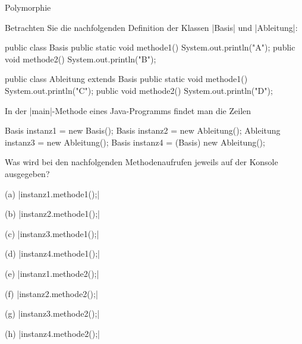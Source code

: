 \begin{exercise}{Polymorphie}
\begin{body}
Betrachten Sie die nachfolgenden Definition der Klassen \code|Basis| und \code|Ableitung|:
\medskip
\begin{displaycode}
public class Basis {
    public static void methode1() {
        System.out.println("A");
    }        
    public void methode2() {
        System.out.println("B");
    }
}
\end{displaycode}
\medskip
\begin{displaycode}
public class Ableitung extends Basis {
    public static void methode1() {
        System.out.println("C");
    }         
    public void methode2() {
        System.out.println("D");
    }
}
\end{displaycode}
\medskip
In der \code|main|-Methode eines Java-Programms findet man die Zeilen
\begin{displaycode}
        Basis instanz1 = new Basis();
        Basis instanz2 = new Ableitung();
        Ableitung instanz3 = new Ableitung();
        Basis instanz4 = (Basis) new Ableitung();
\end{displaycode}
Was wird bei den nachfolgenden Methodenaufrufen jeweils auf der Konsole ausgegeben?
\medskip
\begin{center}
\begin{minipage}{0.45\textwidth}
\begin{parts}
\item[(a)]
\code|instanz1.methode1();|

\item[(b)]
\code|instanz2.methode1();|

\item[(c)]
\code|instanz3.methode1();|

\item[(d)]
\code|instanz4.methode1();|
\end{parts}
\end{minipage}
\begin{minipage}{0.45\textwidth}
\begin{parts}
\item[(e)]
\code|instanz1.methode2();|

\item[(f)]
\code|instanz2.methode2();|

\item[(g)]
\code|instanz3.methode2();|

\item[(h)]
\code|instanz4.methode2();|
\end{parts}
\end{minipage}
\end{center}
\end{body}



\end{exercise}
